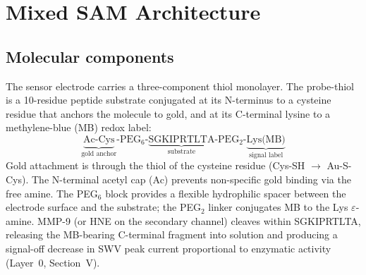 \documentclass[10pt,a4paper]{article}
\numberwithin{equation}{section}
\begin{document}
\section{Mixed SAM Architecture}
\label{sec:architecture}

\subsection{Molecular components}

The sensor electrode carries a three-component thiol monolayer. The probe-thiol is
a 10-residue peptide substrate conjugated at its N-terminus to a cysteine residue
that anchors the molecule to gold, and at its C-terminal lysine to a methylene-blue
(MB) redox label:
\[
  \underbrace{\text{Ac-Cys}}_{\text{gold anchor}} \text{-PEG}_6\text{-}
  \underbrace{\text{SGKIPRTLTA}}_{\text{substrate}} \text{-PEG}_2\text{-}
  \underbrace{\text{Lys(MB)}}_{\text{signal label}}
\]
Gold attachment is through the thiol of the cysteine residue (Cys-SH $\to$ Au-S-Cys).
The N-terminal acetyl cap (Ac) prevents non-specific gold binding via the free amine.
The PEG$_6$ block provides a flexible hydrophilic spacer between the electrode surface
and the substrate; the PEG$_2$ linker conjugates MB to the Lys $\varepsilon$-amine.
MMP-9 (or HNE on the secondary channel) cleaves within SGKIPRTLTA, releasing the
MB-bearing C-terminal fragment into solution and producing a signal-off decrease in
SWV peak current proportional to enzymatic activity (Layer~0, Section~V).
\end{document}
